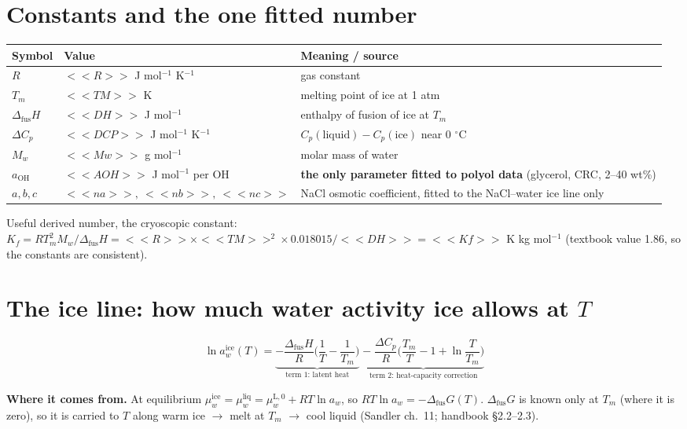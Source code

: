 \documentclass[11pt,a4paper]{article}
\newcommand{\dfus}{\Delta_{\mathrm{fus}}}
\newcommand{\aoh}{a_{\mathrm{OH}}}
\newcommand{\aice}{\ln a_w^{\mathrm{ice}}}
\begin{document}
\section*{Constants and the one fitted number}
\begin{tabularx}{\textwidth}{@{}l l L@{}}
\toprule
Symbol & Value & Meaning / source\\
\midrule
$R$ & $<<R>>$ J mol$^{-1}$ K$^{-1}$ & gas constant\\
$T_m$ & $<<TM>>$ K & melting point of ice at 1 atm\\
$\dfus H$ & $<<DH>>$ J mol$^{-1}$ & enthalpy of fusion of ice at $T_m$\\
$\Delta C_p$ & $<<DCP>>$ J mol$^{-1}$ K$^{-1}$ & $C_p(\text{liquid})-C_p(\text{ice})$ near 0 $^\circ$C\\
$M_w$ & $<<Mw>>$ g mol$^{-1}$ & molar mass of water\\
$\aoh$ & $<<AOH>>$ J mol$^{-1}$ per OH & \textbf{the only parameter fitted to polyol data} (glycerol, CRC, 2--40 wt\%)\\
$a,b,c$ & $<<na>>,\ <<nb>>,\ <<nc>>$ & NaCl osmotic coefficient, fitted to the NaCl--water ice line only\\
\bottomrule
\end{tabularx}

Useful derived number, the cryoscopic constant: $K_f=RT_m^2M_w/\dfus H=<<R>>\times<<TM>>^2\times0.018015/<<DH>>=<<Kf>>$ K kg mol$^{-1}$
(textbook value 1.86, so the constants are consistent).

\section{The ice line: how much water activity ice allows at $T$}
\begin{eqbox}
\[
\aice(T)=\underbrace{-\frac{\dfus H}{R}\Big(\frac1T-\frac1{T_m}\Big)}_{\text{term 1: latent heat}}
\;\underbrace{-\;\frac{\Delta C_p}{R}\Big(\frac{T_m}{T}-1+\ln\frac{T}{T_m}\Big)}_{\text{term 2: heat-capacity correction}}
\tag{1}\]
\end{eqbox}
\textbf{Where it comes from.} At equilibrium $\mu_w^{\text{ice}}=\mu_w^{\text{liq}}=\mu_w^{\text{L},0}+RT\ln a_w$, so
$RT\ln a_w=-\dfus G(T)$. $\dfus G$ is known only at $T_m$ (where it is zero), so it is carried to $T$ along
warm ice $\rightarrow$ melt at $T_m$ $\rightarrow$ cool liquid (Sandler ch.~11; handbook \S2.2--2.3).
\end{document}
